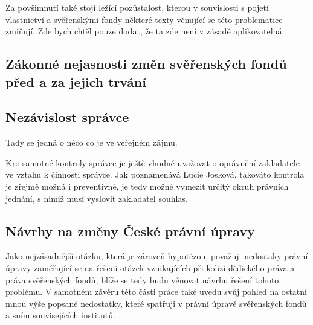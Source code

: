 \documentclass{article}
\begin{document}
Za povšimnutí také stojí ležící pozůstalost, kterou v souvislosti s pojetí vlastnictví a svěřenskými fondy některé texty věnující se této problematice zmiňují. Zde bych chtěl pouze dodat, že ta zde není v zásadě aplikovatelná. 


\subsection{Zákonné nejasnosti změn svěřenských fondů před a za jejich trvání}

\subsection{Nezávislost správce}



Tady se jedná o něco co je ve veřejném zájmu.

Kro samotné kontroly správce je ještě vhodné uvažovat o oprávnění zakladatele ve vztahu k činnosti správce. Jak poznamenává Lucie Josková, takováto kontrola je zřejmě možná i preventivně, je tedy možné vymezit určitý okruh právních jednání, s nimiž musí vyslovit zakladatel souhlas. 




\subsection{Návrhy na změny České právní úpravy}

Jako nejzásadnější otázku, která je zároveň hypotézou, považuji nedostaky právní úpravy zaměřující se na řešení otázek vznikajících při kolizi dědického práva a práva svěřenských fondů, blíže se tedy budu věnovat návrhu řešení tohoto problému. V samotném závěru této části práce také uvedu svůj pohled na ostatní mnou výše popsané nedostatky, které spatřuji v právní úpravě svěřenských fondů a sním souvisejících institutů.\\
\end{document}
